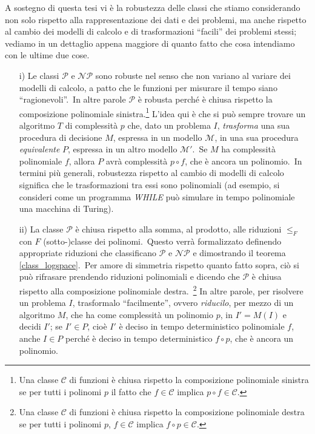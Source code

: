 A sostegno di questa tesi vi è la robustezza delle classi che stiamo considerando non solo rispetto alla rappresentazione dei dati e dei problemi, ma anche rispetto al cambio dei modelli di calcolo e di trasformazioni ``facili'' dei problemi stessi; vediamo in un dettaglio appena maggiore di quanto fatto che cosa intendiamo con le ultime due cose.\
\begin{itemize}
    \item[i)] Le classi $\mathcal{P}$ e $\mathcal{NP}$ sono robuste nel senso che non variano al variare dei modelli di calcolo, a patto che le funzioni per misurare il tempo siano ``ragionevoli''.\
          In altre parole $\mathcal{P}$ è robusta perché è chiusa rispetto la composizione polinomiale sinistra.\footnote{Una classe $\mathcal{C}$ di funzioni è chiusa rispetto la composizione polinomiale sinistra se per tutti i polinomi $p$ il fatto che $f \in \mathcal{C}$ implica $p \circ f \in \mathcal{C}$.}
          L'idea qui è che si può sempre trovare un algoritmo $T$ di complessità $p$ che, dato un problema $I$, \textit{trasforma} una sua procedura di decisione $M$, espressa in un modello $\mathcal{M}$, in una sua procedura \textit{equivalente} $P$, espressa in un altro modello $\mathcal{M}'$.\
          Se $M$ ha complessità polinomiale $f$, allora $P$ avrà complessità $p \circ f$, che è ancora un polinomio.\
          In termini più generali, robustezza rispetto al cambio di modelli di calcolo significa che le trasformazioni tra essi sono polinomiali (ad esempio, si consideri come un programma \textit{\footnotesize WHILE} può simulare in tempo polinomiale una macchina di Turing).
    \item[ii)]  La classe $\mathcal{P}$ è chiusa rispetto alla somma, al prodotto, alle riduzioni $\leqslant_F$ con $F$ (sotto-)classe dei polinomi.\
          Questo verrà formalizzato definendo appropriate riduzioni che classificano $\mathcal{P}$ e $\mathcal{NP}$ e dimostrando il teorema \ref{class_logspace}.\
          Per amore di simmetria rispetto quanto fatto sopra, ciò si può rifrasare prendendo riduzioni polinomiali e dicendo che $\mathcal{P}$ è chiusa rispetto alla composizione polinomiale destra.\
          \footnote{Una classe $\mathcal{C}$ di funzioni è chiusa rispetto la composizione polinomiale destra se per tutti i polinomi $p$, $f \in \mathcal{C}$ implica $f \circ p \in \mathcal{C}$.}
          In altre parole, per risolvere un problema $I$, trasformalo ``facilmente'', ovvero \textit{riducilo}, per mezzo di un algoritmo $M$, che ha come complessità un polinomio $p$, in $I' = M(I)$ e decidi $I'$; se $I' \in P$, cioè $I'$ è deciso in tempo deterministico polinomiale $f$, anche $I \in P$ perché è deciso in tempo deterministico $f \circ p$, che è ancora un polinomio.\

\end{itemize}

